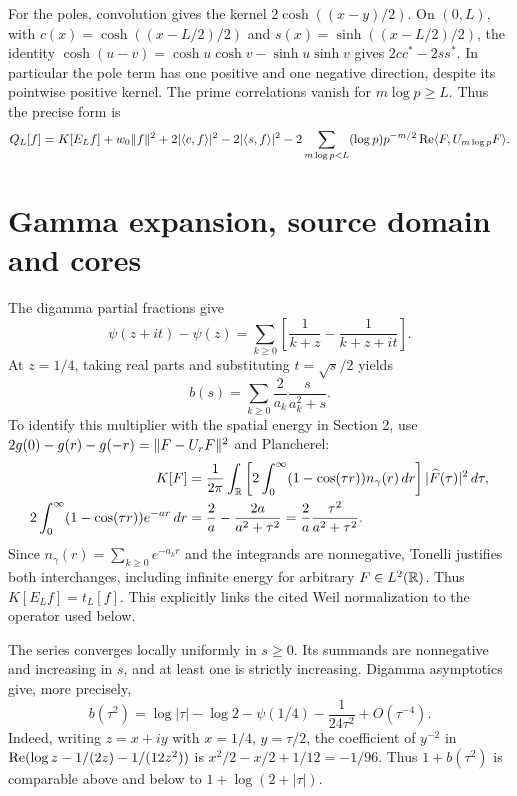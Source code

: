 For the poles, convolution gives the kernel $2\cosh((x-y)/2)$.
On $(0,L)$, with $c(x)=\cosh((x-L/2)/2)$ and
$s(x)=\sinh((x-L/2)/2)$, the identity
$\cosh(u-v)=\cosh u\cosh v-\sinh u\sinh v$ gives
$2cc^*-2ss^*$. In particular the pole term has one positive and one
negative direction, despite its pointwise positive kernel.
The prime correlations vanish for $m\log p\ge L$. Thus the precise
form is
\begin{equation}\label{d:full-form}
Q_L[f]=K[E_Lf]+w_0\lVert f\rVert^2+2|\langle c,f\rangle|^2-2|\langle s,f\rangle|^2
-2\sum_{m\log p<L}(\log p)p^{-m/2}\operatorname{Re}\langle F,U_{m\log p}F\rangle.
\end{equation}

\section{Gamma expansion, source domain and cores}
The digamma partial fractions \cite{DLMF} give
\[
\psi(z+it)-\psi(z)=\sum_{k\ge0}
\left[\frac1{k+z}-\frac1{k+z+it}\right].
\]
At $z=1/4$, taking real parts and substituting $t=\sqrt{s}/2$ yields
\begin{equation}\label{d:gamma-series}
b(s)=\sum_{k\ge0}\frac2{a_k}\frac{s}{a_k^2+s}.
\end{equation}
To identify this multiplier with the spatial energy in Section 2, use
$2g(0)-g(r)-g(-r)=\lVert F-U_rF\rVert^2$ and Plancherel:
\begin{align}
K[F]&=\frac1{2\pi}\int_\mathbb R
\left[2\int_0^\infty(1-\cos(\tau r))n_\gamma(r)\,dr\right]
|\widehat F(\tau)|^2\,d\tau,\label{d:gamma-fourier}\\
2\int_0^\infty(1-\cos(\tau r))e^{-ar}\,dr
&=\frac2a-\frac{2a}{a^2+\tau^2}
=\frac2a\frac{\tau^2}{a^2+\tau^2}.\notag
\end{align}
Since $n_\gamma(r)=\sum_{k\ge0}e^{-a_kr}$ and the integrands are
nonnegative, Tonelli justifies both interchanges, including infinite
energy for arbitrary $F\in L^2(\mathbb R)$. Thus
$K[E_Lf]=t_L[f]$. This explicitly links the cited Weil normalization
to the operator used below.

The series converges locally uniformly in $s\ge0$. Its summands are
nonnegative and increasing in $s$, and at least one is strictly increasing.
Digamma asymptotics give, more precisely,
\[
b(\tau^2)=\log|\tau|-\log2-\psi(1/4)
-\frac1{24\tau^2}+O(\tau^{-4}).
\]
Indeed, writing $z=x+iy$ with $x=1/4$, $y=\tau/2$, the coefficient
of $y^{-2}$ in $\operatorname{Re}(\log z-1/(2z)-1/(12z^2))$ is
$x^2/2-x/2+1/12=-1/96$.
Thus $1+b(\tau^2)$ is comparable above and below to
$1+\log(2+|\tau|)$.

